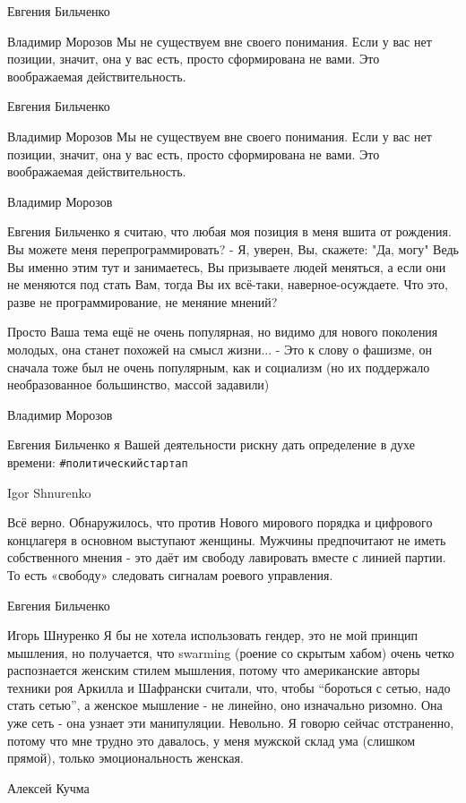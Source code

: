 Евгения Бильченко

Владимир Морозов Мы не существуем вне своего понимания. Если у вас нет позиции,
значит, она у вас есть, просто сформирована не вами. Это воображаемая
действительность.

Евгения Бильченко

Владимир Морозов Мы не существуем вне своего понимания. Если у вас нет позиции,
значит, она у вас есть, просто сформирована не вами. Это воображаемая
действительность.

Владимир Морозов

Евгения Бильченко я считаю, что любая моя позиция в меня вшита от рождения. Вы
можете меня перепрограммировать? - Я, уверен, Вы, скажете: "Да, могу" Ведь Вы
именно этим тут и занимаетесь, Вы призываете людей меняться, а если они не
меняются под стать Вам, тогда Вы их всё-таки, наверное-осуждаете. Что это,
разве не программирование, не меняние мнений?

Просто Ваша тема ещё не очень популярная, но видимо для нового поколения
молодых, она станет похожей на смысл жизни... - Это к слову о фашизме, он сначала
тоже был не очень популярным, как и социализм (но их поддержало необразованное
большинство, массой задавили)

Владимир Морозов

Евгения Бильченко я Вашей деятельности рискну дать определение в духе времени:
\verb|#политическийстартап|

Igor Shnurenko

Всё верно. Обнаружилось, что против Нового мирового порядка и цифрового
концлагеря в основном выступают женщины. Мужчины предпочитают не иметь
собственного мнения - это даёт им свободу лавировать вместе с линией партии. То
есть «свободу» следовать сигналам роевого управления.

Евгения Бильченко

Игорь Шнуренко Я бы не хотела использовать гендер, это не мой принцип мышления,
но получается, что swarming (роение со скрытым хабом) очень четко распознается
женским стилем мышления, потому что американские авторы техники роя Аркилла и
Шафрански считали, что, чтобы \enquote{бороться с сетью, надо стать сетью}, а женское
мышление - не линейно, оно изначально ризомно. Она уже сеть - она узнает эти
манипуляции. Невольно. Я говорю сейчас отстраненно, потому что мне трудно это
давалось, у меня мужской склад ума (слишком прямой), только эмоциональность
женская.

Алексей Кучма

